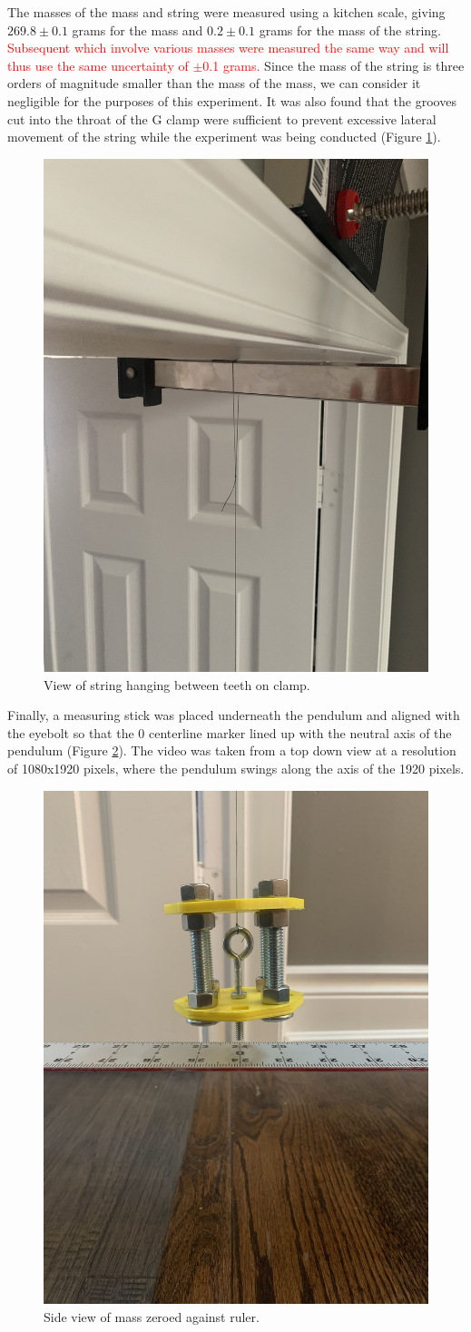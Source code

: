 \documentclass[11pt]{article}
\begin{document}
        The masses of the mass and string were measured using a kitchen scale, giving $269.8 \pm 0.1$ grams for the mass and $0.2 \pm 0.1$ grams for the mass of the string. \textcolor{red}{Subsequent which involve various masses were measured the same way and will thus use the same uncertainty of $\pm$0.1 grams.} Since the mass of the string is three orders of magnitude smaller than the mass of the mass, we can consider it negligible for the purposes of this experiment.
        It was also found that the grooves cut into the throat of the G clamp were sufficient to prevent excessive lateral movement of the string while the experiment was being conducted (Figure \ref{fig:clamp}).
        \begin{figure}[H]
            \centering\includegraphics[angle = 270, width=.45\linewidth]{clampView.jpg}
            \caption{View of string hanging between teeth on clamp.}
            \label{fig:clamp}
        \end{figure}

       Finally, a measuring stick was placed underneath the pendulum and aligned with the eyebolt so that the 0 centerline marker lined up with the neutral axis of the pendulum (Figure \ref{fig:zeroed}). The video was taken from a top down view at a resolution of 1080x1920 pixels, where the pendulum swings along the axis of the 1920 pixels.

        \begin{figure}[H]
            \centering\includegraphics[width = 0.4\linewidth]{zeroed.jpg}
            \caption{Side view of mass zeroed against ruler.}
            \label{fig:zeroed}
        \end{figure}
\end{document}
